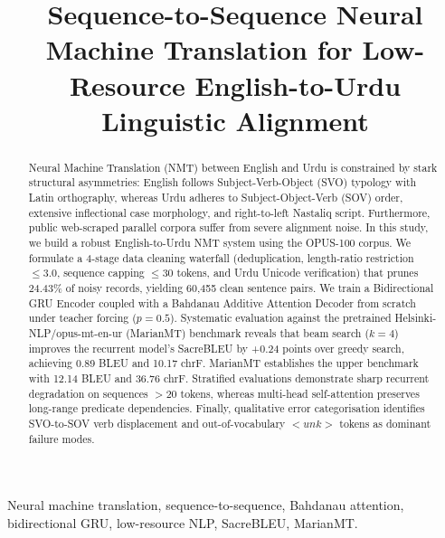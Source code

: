 \documentclass[conference]{IEEEtran}
\begin{document}
\title{Sequence-to-Sequence Neural Machine Translation for Low-Resource English-to-Urdu Linguistic Alignment}

\author{
}

\maketitle

\begin{abstract}
Neural Machine Translation (NMT) between English and Urdu is constrained by stark structural asymmetries: English follows Subject-Verb-Object (SVO) typology with Latin orthography, whereas Urdu adheres to Subject-Object-Verb (SOV) order, extensive inflectional case morphology, and right-to-left Nastaliq script. Furthermore, public web-scraped parallel corpora suffer from severe alignment noise. In this study, we build a robust English-to-Urdu NMT system using the OPUS-100 corpus. We formulate a 4-stage data cleaning waterfall (deduplication, length-ratio restriction $\le 3.0$, sequence capping $\le 30$ tokens, and Urdu Unicode verification) that prunes 24.43\% of noisy records, yielding 60,455 clean sentence pairs. We train a Bidirectional GRU Encoder coupled with a Bahdanau Additive Attention Decoder from scratch under teacher forcing ($p=0.5$). Systematic evaluation against the pretrained Helsinki-NLP/opus-mt-en-ur (MarianMT) benchmark reveals that beam search ($k=4$) improves the recurrent model's SacreBLEU by +0.24 points over greedy search, achieving 0.89 BLEU and 10.17 chrF. MarianMT establishes the upper benchmark with 12.14 BLEU and 36.76 chrF. Stratified evaluations demonstrate sharp recurrent degradation on sequences $>20$ tokens, whereas multi-head self-attention preserves long-range predicate dependencies. Finally, qualitative error categorisation identifies SVO-to-SOV verb displacement and out-of-vocabulary $<unk>$ tokens as dominant failure modes.
\end{abstract}

\begin{IEEEkeywords}
Neural machine translation, sequence-to-sequence, Bahdanau attention, bidirectional GRU, low-resource NLP, SacreBLEU, MarianMT.
\end{IEEEkeywords}
\end{document}

